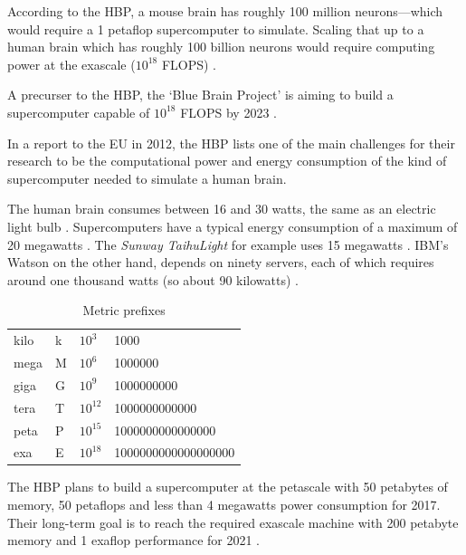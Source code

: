 According to the \ac{HBP}, a mouse brain has roughly 100 million neurons---which would require a 1 petaflop supercomputer to simulate. Scaling that up to a human brain which has roughly 100 billion neurons would require computing power at the exascale ($10^18$ \ac{FLOPS}) \autocite{Walker2012}.

A precurser to the \ac{HBP}, the `Blue Brain Project' is aiming to build a supercomputer capable of $10^{18}$ \ac{FLOPS} by 2023 \autocite{Kurzweil2013}.

In a report to the \ac{EU} in 2012, the \ac{HBP} lists one of the main challenges for their research to be the computational power and energy consumption of the kind of supercomputer needed to simulate a human brain.

The human brain consumes between 16 and 30 watts, the same as an electric light bulb \autocite{Walker2012,Jabr2012}. Supercomputers have a typical energy consumption of a maximum of 20 megawatts \autocite{Walker2012}. The \textit{Sunway TaihuLight} for example uses 15 megawatts \autocite{Fu2016}. IBM's Watson on the other hand, depends on ninety servers, each of which requires around one thousand watts (so about 90 kilowatts) \autocite{Jabr2012}.

\begin{table}[!htbp]
\centering
\caption{Metric prefixes}
\label{tab:metric}
\begin{tabu}{@{}llll@{}}
\toprule
kilo & k & $10^3$    & \num{1000}                \\
mega & M & $10^6$    & \num{1000000}             \\
giga & G & $10^9$    & \num{1000000000}          \\
tera & T & $10^{12}$ & \num{1000000000000}       \\
peta & P & $10^{15}$ & \num{1000000000000000}    \\
exa  & E & $10^{18}$ & \num{1000000000000000000} \\ 
\bottomrule
\end{tabu}
\end{table}

The \ac{HBP} plans to build a supercomputer at the petascale with 50 petabytes of memory, 50 petaflops and less than 4 megawatts power consumption for 2017. Their long-term goal is to reach the required exascale machine with 200 petabyte memory and 1 exaflop performance for 2021 \autocite{Walker2012}.


